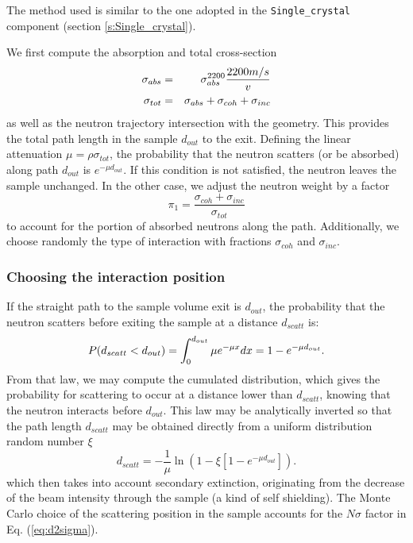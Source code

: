 The method used is similar to the one adopted in the \verb+Single_crystal+ component (section \ref{s:Single_crystal}).

We first compute the absorption and total cross-section
\begin{eqnarray}
\sigma_{abs} &=& \sigma_{abs}^{{\rm 2200}}\frac{2200 m/s}{v} \\
\sigma_{tot} &=& \sigma_{abs} + \sigma_{coh} + \sigma_{inc}
\end{eqnarray}
as well as the neutron trajectory intersection with the geometry. This provides the total path length in the sample $d_{out}$ to the exit.
Defining the linear attenuation $\mu = \rho\sigma_{tot}$, the probability that the neutron scatters (or be absorbed) along path $d_{out}$ is $e^{-\mu d_{out}}$. If this condition is not satisfied, the neutron leaves the sample unchanged.
In the other case, we adjust the neutron weight by a factor
\begin{equation}
\pi_1 = \frac{\sigma_{coh} + \sigma_{inc}}{\sigma_{tot}}
\end{equation}
to account for the portion of absorbed neutrons along the path.
Additionally, we choose randomly the type of interaction with fractions $\sigma_{coh}$ and $\sigma_{inc}$.

\subsubsection{Choosing the interaction position}

If the straight path to the sample volume exit is $d_{out}$, the probability that the neutron scatters before exiting the sample at a distance $d_{scatt}$ is:
\begin{equation}
P(d_{scatt} < d_{out}) = \int_0^{d_{out}} \mu e^{-\mu x}dx = 1 - e^{-\mu d_{out}}. \\
\end{equation}
From that law, we may compute the cumulated distribution, which gives the probability for scattering to occur at a distance lower than $d_{scatt}$, knowing that the neutron interacts before $d_{out}$. This law may be analytically inverted so that the path length $d_{scatt}$ may be obtained directly from a uniform distribution random number $\xi$
\begin{equation}
d_{scatt} = -\frac{1}{\mu} \ln(1 - \xi[1 -e^{-\mu d_{out}}]).
\end{equation}
which then takes into account secondary extinction, originating from the decrease of the beam intensity through the sample (a kind of self shielding).
The Monte Carlo choice of the scattering position in the sample accounts for the $N \sigma$ factor in Eq. (\ref{eq:d2sigma}).

